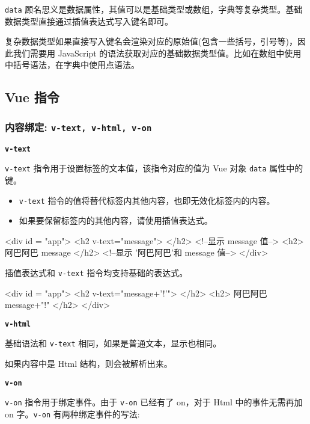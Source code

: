 \texttt{data} 顾名思义是数据属性，其值可以是基础类型或数组，字典等复杂类型。基础数据类型直接通过插值表达式写入键名即可。

复杂数据类型如果直接写入键名会渲染对应的原始值(包含一些括号，引号等)，因此我们需要用 JavaScript 的语法获取对应的基础数据类型值。比如在数组中使用中括号语法，在字典中使用点语法。



\subsection{Vue 指令}
\subsubsection{内容绑定: \texttt{v-text, v-html, v-on}}
\noindent\textbf{\texttt{v-text}}

\texttt{v-text} 指令用于设置标签的文本值，该指令对应的值为 Vue 对象 \texttt{data} 属性中的键。
\begin{itemize}
    \item \texttt{v-text} 指令的值将替代标签内其他内容，也即无效化标签内的内容。
    \item 如果要保留标签内的其他内容，请使用插值表达式。
\end{itemize}

\begin{HTML}
<div id = "app">
    <h2 v-text="message"> </h2>     <!--显示 message 值-->
    <h2> 阿巴阿巴 {{message}} </h2>     <!--显示 '阿巴阿巴'和 message 值-->
</div>
\end{HTML}

插值表达式和 \texttt{v-text} 指令均支持基础的表达式。

\begin{HTML}
<div id = "app">
    <h2 v-text="message+'!'"> </h2>     
    <h2> 阿巴阿巴 {{message+"!"}} </h2>     
</div>
\end{HTML}

\noindent\textbf{\texttt{v-html}}

基础语法和 \texttt{v-text} 相同，如果是普通文本，显示也相同。

如果内容中是 Html 结构，则会被解析出来。



\noindent\textbf{\texttt{v-on}}

\texttt{v-on} 指令用于绑定事件。由于 \texttt{v-on} 已经有了 on，对于 Html 中的事件无需再加 on 字。\texttt{v-on} 有两种绑定事件的写法:

